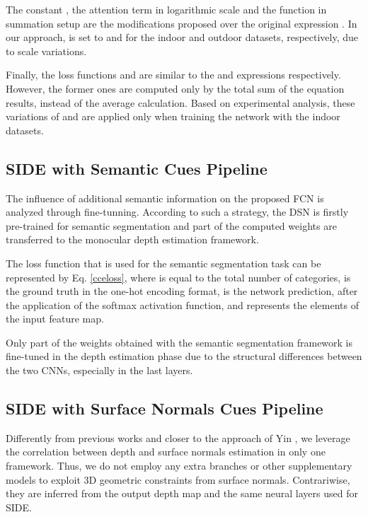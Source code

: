 \documentclass[5p]{elsarticle}
\begin{document}
The constant , the attention term  in logarithmic scale and the function  in summation setup are the modifications proposed over the original expression \cite{jiao2018look}. In our approach,  is set to  and  for the indoor and outdoor datasets, respectively, due to scale variations.




Finally, the loss functions  and  are similar to the  and  expressions respectively. However, the former ones are computed only by the total sum of the equation results, instead of the average calculation. Based on experimental analysis, these variations of  and  are applied only when training the network with the indoor datasets.

\subsection{SIDE with Semantic Cues Pipeline}

The influence of additional semantic information on the proposed FCN is analyzed through fine-tunning. According to such a strategy, the DSN is firstly pre-trained for semantic segmentation and part of the computed weights are transferred to the monocular depth estimation framework. 

The loss function that is used for the semantic segmentation task can be represented by Eq. \ref{cceloss}, where  is equal to the total number of categories,  is the ground truth in the one-hot encoding format,  is the network prediction, after the application of the softmax activation function, and  represents the elements of the input feature map.



Only part of the weights obtained with the semantic segmentation framework is fine-tuned in the depth estimation phase due to the structural differences between the two CNNs, especially in the last layers.

\subsection{SIDE with Surface Normals Cues Pipeline}

Differently from previous works \cite{wang2016surge,qi2018geonet,zhang2019pattern} and closer to the approach of Yin \etal\cite{yin2019enforcing}, we leverage the correlation between depth and surface normals estimation in only one framework. Thus, we do not employ any extra branches or other supplementary models to exploit 3D geometric constraints from surface normals. Contrariwise, they are inferred from the output depth map and the same neural layers used for SIDE.     
\end{document}
